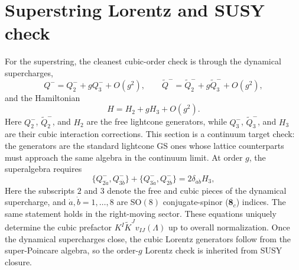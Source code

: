 \documentclass[11pt]{article}
\numberwithin{equation}{section}
\begin{document}
\section{Superstring Lorentz and SUSY check}
For the superstring, the cleanest cubic-order check is through the dynamical supercharges,
\begin{equation}
\label{eq:s15-001}
Q^- = Q^-_2 + g Q^-_3 + O(g^2),
\qquad
\widetilde Q^- = \widetilde Q^-_2 + g \widetilde Q^-_3 + O(g^2),
\end{equation}
and the Hamiltonian
\begin{equation}
\label{eq:s15-002}
H = H_2 + g H_3 + O(g^2).
\end{equation}
Here $Q^-_2$, $\widetilde Q^-_2$, and $H_2$ are the free lightcone generators, while $Q^-_3$, $\widetilde Q^-_3$, and $H_3$ are their cubic interaction corrections. This section is a continuum target check: the generators are the standard lightcone GS ones whose lattice counterparts must approach the same algebra in the continuum limit.
At order $g$, the superalgebra requires
\begin{equation}
\label{eq:s15-003}
\{Q^-_{2\dot a},Q^-_{3\dot b}\}
+\{Q^-_{3\dot a},Q^-_{2\dot b}\}
=
2\delta_{\dot a\dot b} H_3,
\end{equation}
Here the subscripts $2$ and $3$ denote the free and cubic pieces of the dynamical supercharge, and $\dot a,\dot b=1,\dots,8$ are SO$(8)$ conjugate-spinor ($\mathbf{8}_c$) indices. The same statement holds in the right-moving sector. These equations uniquely determine the cubic prefactor $K^I \widetilde K^J v_{IJ}(\Lambda)$ up to overall normalization. Once the dynamical supercharges close, the cubic Lorentz generators follow from the super-Poincare algebra, so the order-$g$ Lorentz check is inherited from SUSY closure.
\end{document}
